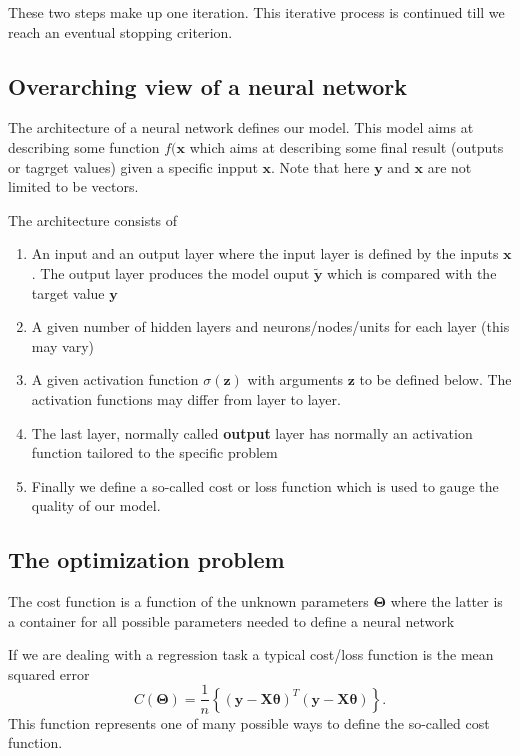 \documentclass[%
oneside,                 %
final,                   %
10pt]{article}
\begin{document}
\noindent
These two steps make up one iteration. This iterative process is continued till we reach an eventual stopping criterion.

\subsection{Overarching view of a neural network}

The architecture of a neural network defines our model. This model
aims at describing some function $f(\bm{x}$ which aims at describing
some final result (outputs or tagrget values) given a specific inpput
$\bm{x}$. Note that here $\bm{y}$ and $\bm{x}$ are not limited to be
vectors.

The architecture consists of
\begin{enumerate}
\item An input and an output layer where the input layer is defined by the inputs $\bm{x}$. The output layer produces the model ouput $\bm{\tilde{y}}$ which is compared with the target value $\bm{y}$

\item A given number of hidden layers and neurons/nodes/units for each layer (this may vary)

\item A given activation function $\sigma(\bm{z})$ with arguments $\bm{z}$ to be defined below. The activation functions may differ from layer to layer.

\item The last layer, normally called \textbf{output} layer has normally an activation function tailored to the specific problem

\item Finally we define a so-called cost or loss function which is used to gauge the quality of our model. 
\end{enumerate}

\noindent
\subsection{The optimization problem}

The cost function is a function of the unknown parameters
$\bm{\Theta}$ where the latter is a container for all possible
parameters needed to define a neural network

If we are dealing with a regression task a typical cost/loss function
is the mean squared error
\[
C(\bm{\Theta})=\frac{1}{n}\left\{\left(\bm{y}-\bm{X}\bm{\theta}\right)^T\left(\bm{y}-\bm{X}\bm{\theta}\right)\right\}.
\]
This function represents one of many possible ways to define
the so-called cost function.
\end{document}
